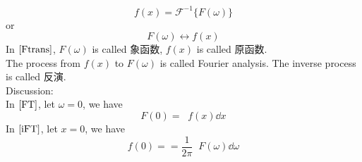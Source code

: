 \documentclass[UTF8]{ctexart} %
\DeclareMathOperator{\intdinf}{\int_{-\infty}^\infty}
\numberwithin{equation}{section}
\begin{document}
\begin{equation}\label{key}
f(x)=\mathcal{F}^{-1}\{F(\omega)\}
\end{equation}
or
\begin{equation}\label{key}
F(\omega)\longleftrightarrow f(x)
\end{equation}
In $\eqref{Ftrans}$, $F(\omega)$ is called 象函数, $f(x)$ is called 原函数.\\
The process from $f(x)$ to $F(\omega)$ is called Fourier analysis. The inverse process is called 反演.\\
Discussion:\\
In $\eqref{FT}$, let $\omega=0$, we have
\begin{equation}\label{key}
F(0)=\intdinf f(x)\dd x
\end{equation}
In $\eqref{iFT}$, let $x=0$, we have
\begin{equation}\label{key}
f(0)==\dfrac{1}{2\pi}\intdinf F(\omega) \dd \omega
\end{equation}
\end{document}
